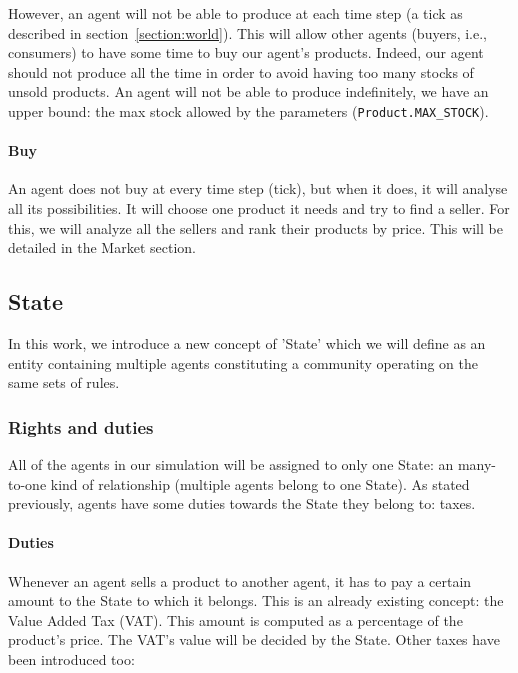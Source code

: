    However, an agent will not be able to produce at each time step (a tick as described in section~\ref{section:world}). This will allow other agents (buyers, i.e., consumers) to have some time to buy our agent's products. Indeed, our agent should not produce all the time in order to avoid having too many stocks of unsold products. An agent will not be able to produce indefinitely, we have an upper bound: the max stock allowed by the parameters (\texttt{Product.MAX\_STOCK}).

    \paragraph{Buy}\label{section:buy}
    An agent does not buy at every time step (tick), but when it does, it will analyse all its possibilities. It will choose one product it needs and try to find a seller. For this, we will analyze all the sellers and rank their products by price. This will be detailed in the Market section.


\subsection{State}\label{section:state}
In this work, we introduce a new concept of 'State' which we will define as an entity containing multiple agents constituting a community operating on the same sets of rules.

    \subsubsection{Rights and duties}
    All of the agents in our simulation will be assigned to only one State: an many-to-one kind of relationship (multiple agents belong to one State). As stated previously, agents have some duties towards the State they belong to: taxes.

        \paragraph{Duties}
            Whenever an agent sells a product to another agent, it has to pay a certain amount to the State to which it belongs. This is an already existing concept: the Value Added Tax (VAT). This amount is computed as a percentage of the product's price. The VAT's value will be decided by the State. Other taxes have been introduced too:

